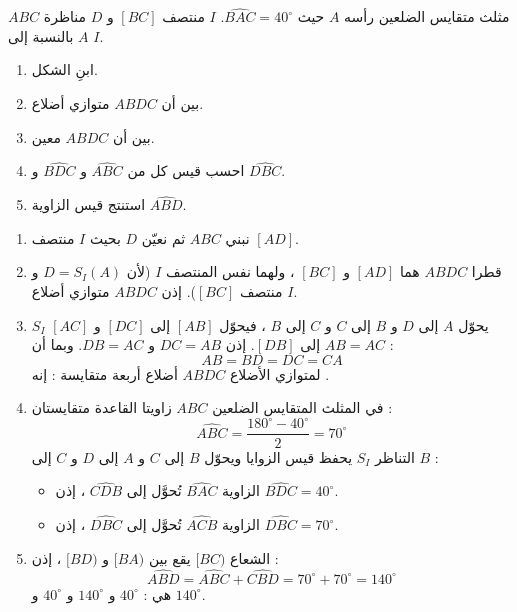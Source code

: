 \documentclass[12pt,a4paper]{article}
\begin{document}
\begin{corr}[title={مثلث متقايس الضلعين ومناظره}, stars=3, source={Axiomaths}]
$ABC$ مثلث متقايس الضلعين رأسه $A$ حيث $\widehat{BAC}=40^\circ$. $I$ منتصف $[BC]$ و $D$ مناظرة $A$ بالنسبة إلى $I$.
\begin{enumerate}
  \item ابنِ الشكل.
  \item بين أن $ABDC$ متوازي أضلاع.
  \item بين أن $ABDC$ معين.
  \item احسب قيس كل من $\widehat{ABC}$ و $\widehat{BDC}$ و $\widehat{DBC}$.
  \item استنتج قيس الزاوية $\widehat{ABD}$.
\end{enumerate}
\axsol
\begin{enumerate}[itemsep=14pt]
  \item نبني $ABC$ ثم نعيّن $D$ بحيث $I$ منتصف $[AD]$.
  \begin{center}
  \end{center}
  \item قطرا $ABDC$ هما $[AD]$ و $[BC]$ ، ولهما نفس المنتصف $I$ (لأن $D=S_I(A)$ و $I$ منتصف $[BC]$). إذن $ABDC$ متوازي أضلاع.
  \item $S_I$ يحوّل $A$ إلى $D$ و $B$ إلى $C$ و $C$ إلى $B$ ، فيحوّل $[AB]$ إلى $[DC]$ و $[AC]$ إلى $[DB]$. إذن $DC=AB$ و $DB=AC$. وبما أن $AB=AC$ :
  \[AB=BD=DC=CA\]
  لمتوازي الأضلاع $ABDC$ أضلاع أربعة متقايسة : إنه .
  \item في المثلث المتقايس الضلعين $ABC$ زاويتا القاعدة متقايستان :
  \[\widehat{ABC}=\dfrac{180^\circ-40^\circ}{2}=70^\circ\]
  التناظر $S_I$ يحفظ قيس الزوايا ويحوّل $B$ إلى $C$ و $A$ إلى $D$ و $C$ إلى $B$ :
  \begin{itemize}
    \item الزاوية $\widehat{BAC}$ تُحوَّل إلى $\widehat{CDB}$ ، إذن $\widehat{BDC}=40^\circ$.
    \item الزاوية $\widehat{ACB}$ تُحوَّل إلى $\widehat{DBC}$ ، إذن $\widehat{DBC}=70^\circ$.
  \end{itemize}
  \item الشعاع $[BC)$ يقع بين $[BA)$ و $[BD)$ ، إذن :
  \[\widehat{ABD}=\widehat{ABC}+\widehat{CBD}=70^\circ+70^\circ=140^\circ\]
   هي : $40^\circ$ و $140^\circ$ و $40^\circ$ و $140^\circ$.
\end{enumerate}
\end{corr}
\end{document}
